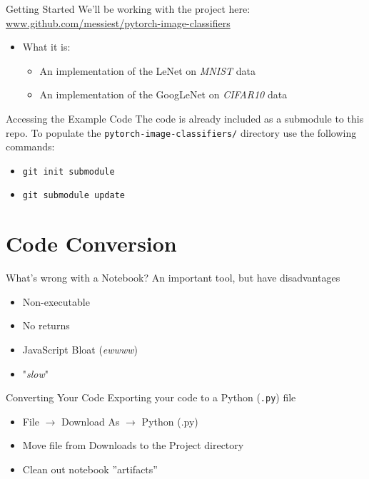 \documentclass[12pt,t]{beamer}
\begin{document}
\begin{frame}{Getting Started}
	We'll be working with the project here:
	\small{\url{www.github.com/messiest/pytorch-image-classifiers}}
	\begin{itemize}
		\item What it is:
		\begin{itemize}
			\item An implementation of the LeNet on \emph{MNIST} data
			\item An implementation of the GoogLeNet on \emph{CIFAR10} data
		\end{itemize}
	\end{itemize}
\end{frame}

\begin{frame}{Accessing the Example Code}
	The code is already included as a submodule to this repo.
	To populate the \texttt{pytorch-image-classifiers/} directory use the following commands:
	\begin{itemize}
		\item \texttt{git init submodule}
		\item \texttt{git submodule update}
	\end{itemize}
\end{frame}

\section{Code Conversion}

\begin{frame}{What's wrong with a Notebook?}
	An important tool, but have disadvantages
	\begin{itemize}
		\item Non-executable
		\item No returns
		\item JavaScript Bloat (\emph{ewwww})
		\item "\emph{slow}"
	\end{itemize}
\end{frame}

\begin{frame}{Converting Your Code}
	Exporting your code to a Python (\texttt{.py}) file
	\begin{itemize}
		\item File $\to$ Download As $\to$ Python (.py)
		\item Move file from Downloads to the Project directory
		\item Clean out notebook ''artifacts''
	\end{itemize}
\end{frame}
\end{document}
